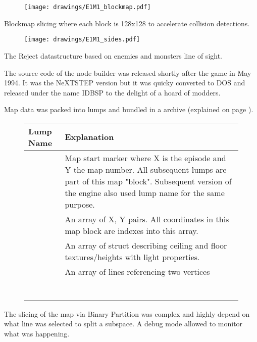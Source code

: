 \begin{figure}[H]
\centering
\texttt{[image: drawings/E1M1\_blockmap.pdf]}
\end{figure}
\par
Blockmap slicing where each block is 128x128 to accelerate collision detections.\\
\par
\begin{figure}[H]
\centering
\texttt{[image: drawings/E1M1\_sides.pdf]}
\end{figure}
\par
The Reject datastructure based on enemies and monsters line of sight.
\pagebreak


The source code of the node builder was released shortly after the game in May 1994. It was the NeXTSTEP version but it was quicky converted to DOS and released under the name IDBSP to the delight of a hoard of modders.\\
\par
{}
\par
Map data was packed into lumps and bundled in a  archive (explained on page \pageref{wad_explained}).\\

\par
 \begin{figure}[H]
\centering  
\begin{tabularx}{\textwidth}{ L{0.15} L{0.75} }
  \toprule
  \textbf{Lump Name} &  \textbf{Explanation} \\
  \toprule 
   
    & Map start marker where X is the episode and Y the map number. All subsequent lumps are part of this map "block". Subsequent version of the engine also used  lump name for the same purpose.\\
   
    & An array of  X, Y pairs. All coordinates in this map block are indexes into this array.\\
    & An array of struct describing ceiling and floor textures/heights with light properties.\\
    & An array of lines referencing two vertices\\
    & \\
    & \\
    & \\
    & \\
    & \\
   
    & \\
    & \\
   \toprule
\end{tabularx}
\end{figure}
\par
{}

\pagebreak

The slicing of the map via Binary Partition was complex and highly depend on what line was selected to split a subspace. A debug mode  allowed to monitor what was happening.\\
\par
{}
\par
